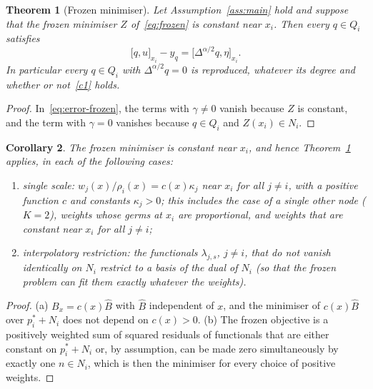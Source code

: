 \documentclass[12pt]{amsart}
\newtheorem{theorem}{Theorem}[section]
\newtheorem{corollary}[theorem]{Corollary}
\theoremstyle{definition}
\theoremstyle{remark}
\newcommand{\fpz}[3]{\bigl[#1,#2\bigr]_{#3}}     %
\begin{document}
\begin{theorem}[Frozen minimiser]\label{thm:frozen}
Let Assumption~\ref{ass:main} hold and suppose that the frozen minimiser $Z$
of~\eqref{eq:frozen} is constant near $x_i$. Then every $q\in Q_i$ satisfies
\begin{equation}\label{eq:frozen-error}
  \fpz{q}{u}{x_i}-y_q=\fpz{\Delta^{\alpha/2}q}{\eta}{x_i}.
\end{equation}
In particular every $q\in Q_i$ with $\Delta^{\alpha/2}q=0$ is reproduced, whatever its degree and
whether or not~\ref{c1} holds.
\end{theorem}

\begin{proof}
In~\eqref{eq:error-frozen}, the terms with $\gamma\ne0$ vanish because $Z$ is constant, and the
term with $\gamma=0$ vanishes because $q\in Q_i$ and $Z(x_i)\in N_i$.
\end{proof}

\begin{corollary}\label{cor:frozen-cases}
The frozen minimiser is constant near $x_i$, and hence Theorem~\ref{thm:frozen} applies, in each
of the following cases:
\begin{enumerate}[label=(\alph*)]
  \item \emph{single scale:} $w_j(x)/\rho_i(x)=c(x)\kappa_j$ near $x_i$ for all $j\ne i$, with a
        positive function $c$ and constants $\kappa_j>0$; this includes the case of a single
        other node ($K=2$), weights whose germs at $x_i$ are proportional, and weights that are
        constant near $x_i$ for all $j\ne i$;
  \item \emph{interpolatory restriction:} the functionals $\lambda_{j,s}$, $j\ne i$, that do not
        vanish identically on $N_i$ restrict to a basis of the dual of $N_i$ (so that the frozen
        problem can fit them exactly whatever the weights).
\end{enumerate}
\end{corollary}

\begin{proof}
(a) $B_x=c(x)\hat B$ with $\hat B$ independent of $x$, and the minimiser of $c(x)\hat B$ over
$p_i^*+N_i$ does not depend on $c(x)>0$. (b) The frozen objective is a positively weighted sum
of squared residuals of functionals that are either constant on $p_i^*+N_i$ or, by assumption,
can be made zero simultaneously by exactly one $n\in N_i$, which is then the minimiser for
every choice of positive weights.
\end{proof}
\end{document}
